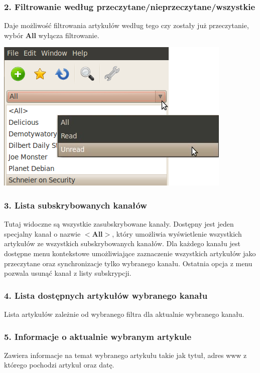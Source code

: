 \documentclass[a4paper,11pt]{report}
\begin{document}
\newpage
\subsubsection*{2. Filtrowanie według przeczytane/nieprzeczytane/wszystkie}
Daje możliwość filtrowania artykułów według tego czy zostały już przeczytanie,
wybór \textbf{All} wyłącza filtrowanie.

\begin{center}
	\includegraphics[scale=0.5]{./img/menu_readmenu1.png}
\end{center}

\subsubsection*{3. Lista subskrybowanych kanałów}
Tutaj widoczne są wszystkie zasubskrybowane kanały. Dostępny jest jeden 
specjalny kanał o nazwie \textbf{$<$All$>$}, który umożliwia wyświetlenie
wszystkich artykułów ze wszystkich subskrybowanych kanałów.
Dla każdego kanału jest dostępne menu kontekstowe umożliwiające zaznaczenie
wszystkich artykułów jako przeczytane oraz synchronizacje tylko wybranego
kanału. Ostatnia opcja z menu pozwala usunąć kanał z listy subskrypcji.

\subsubsection*{4. Lista dostępnych artykułów wybranego kanału}
Lista artykułów zależnie od wybranego filtra dla aktualnie wybranego kanału.

\subsubsection*{5. Informacje o aktualnie wybranym artykule}
Zawiera informacje na temat wybranego artykułu takie jak tytuł, adres www 
z którego pochodzi artykuł oraz datę.
\end{document}
